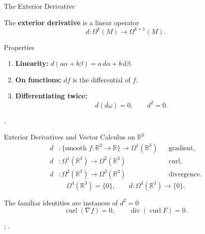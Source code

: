 \documentclass[aspectratio=169,11pt]{beamer}
\newcommand{\sources}[1]{\par\vfill{\scriptsize\color{black!75}#1\par}}
\begin{document}
\begin{frame}{The Exterior Derivative}
  \begin{definition}
    The \textbf{exterior derivative} is a linear operator
    \begin{equation}
      d\colon\Omega^k(M)\longrightarrow\Omega^{k+1}(M).
    \end{equation}
  \end{definition}
  \begin{block}{Properties}
    \begin{enumerate}
      \item \textbf{Linearity:}
        $d(a\alpha+b\beta)=a\,d\alpha+b\,d\beta$.
      \item \textbf{On functions:} $df$ is the differential of $f$.
      \item \textbf{Differentiating twice:}
        \begin{equation}
          d(d\omega)=0,\qquad d^2=0.
        \end{equation}
    \end{enumerate}
  \end{block}
  \sources{\cite[Theorem~14.24, pp.~365--366]{lee2013smooth}.}
\end{frame}

\begin{frame}{Exterior Derivatives and Vector Calculus on $\mathbb{R}^3$}
  \begin{equation}
    \begin{aligned}
      d&\colon\{\text{smooth }f\colon\mathbb{R}^3\to\mathbb{R}\}
        \to\Omega^1(\mathbb{R}^3)
        &&\text{gradient},\\
      d&\colon\Omega^1(\mathbb{R}^3)\to\Omega^2(\mathbb{R}^3)
        &&\text{curl},\\
      d&\colon\Omega^2(\mathbb{R}^3)\to\Omega^3(\mathbb{R}^3)
        &&\text{divergence}.
    \end{aligned}
  \end{equation}
  \begin{equation}
    \Omega^4(\mathbb{R}^3)=\{0\},
    \qquad d\colon\Omega^3(\mathbb{R}^3)\to\{0\}.
  \end{equation}
  \begin{block}{The familiar identities are instances of $d^2=0$}
    \begin{equation}
      \operatorname{curl}(\nabla f)=0,
      \qquad\operatorname{div}(\operatorname{curl}F)=0.
    \end{equation}
  \end{block}
  \sources{\cite[Equation~(14.27), p.~368; Exercise~14.28]{lee2013smooth};
    \cite[\S4.4.1, Table~4.4.8]{bouchard_exterior_vector}.}
\end{frame}
\end{document}
